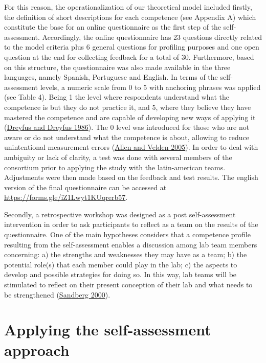 \documentclass[AMA,STIX1COL,APA,STIX2COL]{WileyNJD-v2}
\begin{document}
For this reason, the operationalization of our theoretical model
included firstly, the definition of short descriptions for each
competence (see Appendix A) which constitute the base for an online
questionnaire as the first step of the self-assessment. Accordingly, the
online questionnaire has 23 questions directly related to the model
criteria plus 6 general questions for profiling purposes and one open
question at the end for collecting feedback for a total of 30.
Furthermore, based on this structure, the questionnaire was also made
available in the three languages, namely Spanish, Portuguese and
English. In terms of the self-assessment levels, a numeric scale from 0
to 5 with anchoring phrases was applied (see Table 4). Being 1 the level
where respondents understand what the competence is but they do not
practice it, and 5, where they believe they have mastered the competence
and are capable of developing new ways of applying it
(\protect\hyperlink{ref-Dreyfus1986}{Dreyfus and Dreyfus 1986}). The 0
level was introduced for those who are not aware or do not understand
what the competence is about, allowing to reduce unintentional
measurement errors (\protect\hyperlink{ref-Allen2005}{Allen and Velden
2005}). In order to deal with ambiguity or lack of clarity, a test was
done with several members of the consortium prior to applying the study
with the latin-american teams. Adjustments were then made based on the
feedback and test results. The english version of the final
questionnaire can be accessed at
\url{https://forms.gle/iZ1Lwyt1KUqrerb57}.

Secondly, a retrospective workshop was designed as a post
self-assessment intervention in order to ask participants to reflect as
a team on the results of the questionnaire. One of the main hypotheses
considers that a competence profile resulting from the self-assessment
enables a discussion among lab team members concerning: a) the strengths
and weaknesses they may have as a team; b) the potential role(s) that
each member could play in the lab; c) the aspects to develop and
possible strategies for doing so. In this way, lab teams will be
stimulated to reflect on their present conception of their lab and what
needs to be strengthened (\protect\hyperlink{ref-Sandberg2000}{Sandberg
2000}).

\hypertarget{applying-the-self-assessment-approach}{%
\section{Applying the self-assessment
approach}\label{applying-the-self-assessment-approach}}
\end{document}
